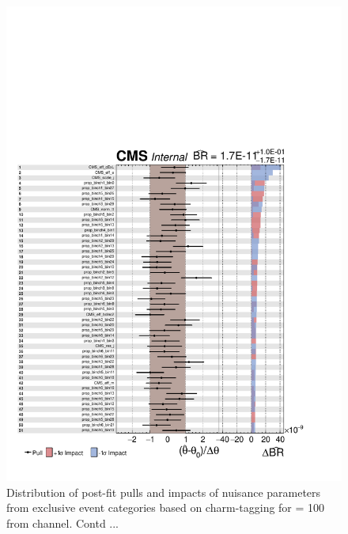 \begin{figure}
\begin{center}
\includegraphics[width=1.0\textwidth]{Image/MLFit/ImpactNuis/nuisImpact1.pdf}
 \caption{Distribution of post-fit pulls and impacts of nuisance 
     parameters from exclusive event categories based on charm-tagging 
     for \mHp = 100 \GeV from \ljets channel. Contd ...}
\label{fig:nuisImpact1}
\end{center}
\end{figure}

